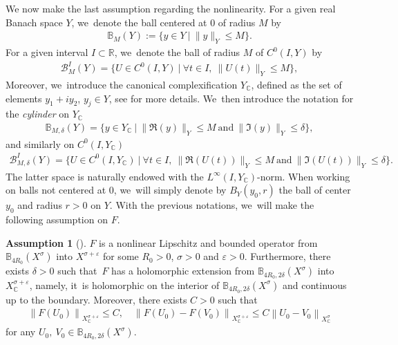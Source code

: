 \documentclass[11pt]{article}
\theoremstyle{definition}
\newtheorem{assum}{Assumption}
\newenvironment{assump}[2][]
{\renewcommand\theassum{#2}\begin{assum}[#1]}
{\end{assum}}
\let\mc\mathcal
\let\veps\varepsilon
\newcommand{\B}{\mc{B}}
\newcommand{\R}{\mathbb{R}}
\providecommand{\norm}[1]{\lVert#1\rVert}
\newcommand\nor[2]{\left\|#1\right\|_{#2}}
\begin{document}
We now make the last assumption regarding the nonlinearity. For a given real Banach space $Y$, we~denote the ball centered at $0$ of radius $M$ by
\begin{align*}
\mathbb{B}_M(Y):=\{y\in Y\ |\ \norm{y}_Y\leq M\}.
\end{align*}
For a given interval $I\subset \R$, we~denote the ball of radius $M$ of $C^0(I, Y)$ by
\begin{align*}
\B_{M}^I(Y)=\{U\in C^0(I, Y)\ |\ \forall t\in I,\ \norm{U(t)}_Y\leq M\},
\end{align*}
Moreover, we~introduce the canonical complexification $Y_\mathbb{C}$, defined as the set of elements $y_1+iy_2$, $y_j\in Y$, see \cite[\S 2]{BS:71-polynomials} for more details. We~then introduce the notation for the \emph{cylinder} on $Y_\mathbb{C}$
\begin{align*}
\mathbb{B}_{M, \delta}(Y)=\{y\in Y_\mathbb{C}\ |\ \norm{\Re(y)}_Y\leq M\ \text{and}\ \norm{\Im(y)}_Y\leq \delta\},
\end{align*}
and similarly on $C^0(I, Y_\mathbb{C})$
\begin{align*}
\B_{M, \delta}^I(Y)=\{U\in C^0(I, Y_\mathbb{C})\ |\ \forall t\in I,\ \norm{\Re(U(t))}_Y\leq M\ \text{and}\ \norm{\Im(U(t))}_Y\leq \delta\}.
\end{align*}
The latter space is naturally endowed with the $L^\infty(I,Y_\mathbb{C})$-norm. When working on balls not centered at $0$, we~will simply denote by $B_Y(y_0, r)$ the ball of center $y_0$ and radius $r>0$ on $Y$. With the previous notations, we~will make the following assumption on $F$.
\begin{assump}{3}
\label{assumFholom}
$F$ is a nonlinear Lipschitz and bounded operator from $\mathbb{B}_{4R_{0}}(X^{\sigma})$ into $X^{\sigma+\veps}$ for some $R_{0}>0$, $\sigma>0$ and $\veps>0$. Furthermore, there exists $\delta>0$ such that~$F$ has a holomorphic extension from $\mathbb{B}_{4R_{0},2\delta}(X^{\sigma})$ into $X^{\sigma+\veps}_{\mathbb{C}}$, namely, it~is holomorphic on the interior of $\mathbb{B}_{4R_{0},2\delta}(X^{\sigma})$ and continuous up to the boundary. Moreover, there exists $C>0$ such that
\begin{align}
\label{boundFanalyticintro}
\nor{F(U_{0})}{X^{\sigma+\veps}_{\mathbb{C}}}\leq C,\quad \nor{F(U_{0})-F(V_{0})}{X^{\sigma+\veps}_{\mathbb{C}}}\leq C \nor{U_{0}-V_{0}}{X^{\sigma}_{\mathbb{C}}}
\end{align}
for any $U_{0},~V_{0}\in \mathbb{B}_{4R_{0},2\delta}(X^{\sigma})$.
\end{assump}
\end{document}
